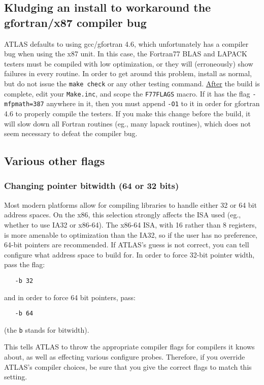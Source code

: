 \documentclass[11pt]{article}
\begin{document}
\subsection{Kludging an install to workaround the gfortran/x87 compiler bug}
\label{sec-gf77err}
ATLAS defaults to using gcc/gfortran 4.6, which unfortunately has a
compiler bug when using the x87 unit.  In this case, the Fortran77
BLAS and LAPACK testers must be compiled with low optimization, or
they will (erroneously) show failures in every routine.  In order to
get around this problem, install as normal, but do not issue the 
\verb+make check+ or any other testing command.  \underline{After}
the build is complete, edit your {\tt Make.inc}, and scope the
\verb+F77FLAGS+ macro.  If it has the flag \verb+-mfpmath=387+ anywhere
in it, then you must append \verb+-O1+ to it in order for gfortran 4.6
to properly compile the testers.
If you make this change before the
build, it will slow down all Fortran routines (eg., many lapack routines),
which does not seem necessary to defeat the compiler bug.

\subsection{Various other flags}
\label{sec-flag-other}

\subsubsection{Changing pointer bitwidth (64 or 32 bits)}
\label{sec-bitwidth}
Most modern platforms allow for compiling libraries to handle either 32 or
64 bit address spaces.  On the x86, this selection strongly affects the ISA
used (eg., whether to use IA32 or x86-64).  The x86-64 ISA, with 16 rather
than 8 registers, is more
amenable to optimization than the IA32, so if the user has no preference,
64-bit pointers are recommended.
If ATLAS's guess is not correct,
you can tell configure what address space to build for.  In order to force
32-bit pointer width, pass the flag:
\vspace*{-0.1in}
\begin{verbatim}
   -b 32
\end{verbatim}
and in order to force 64 bit pointers, pass:
\vspace*{-0.1in}
\begin{verbatim}
   -b 64
\end{verbatim}
(the {\tt b} stands for bitwidth).

This tells ATLAS to throw the appropriate compiler flags for compilers it
knows about, as well as effecting various configure probes.  Therefore, if
you override ATLAS's compiler choices, be sure that you give the correct
flags to match this setting.
\end{document}
